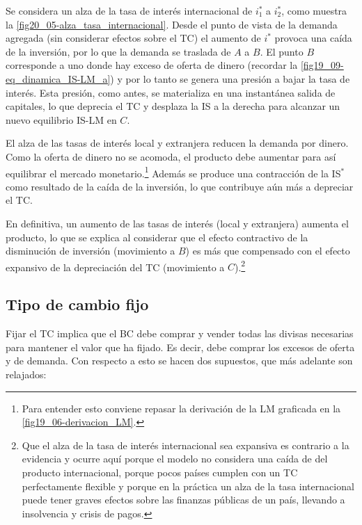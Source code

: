 \documentclass[DeGregorioResumen]{subfiles}
\begin{document}



Se considera un alza de la tasa de interés internacional de $i^*_1$ a $i^*_2$, como muestra la \autoref{fig20_05-alza_tasa_internacional}. Desde el punto de vista de la demanda agregada (sin considerar efectos sobre el TC) el aumento de $i^*$ provoca una caída de la inversión, por lo que la demanda se traslada de $A$ a $B$. El punto $B$ corresponde a uno donde hay exceso de oferta de dinero (recordar la \autoref{fig19_09-eq_dinamica_IS-LM_a}) y por lo tanto se genera una presión a bajar la tasa de interés. Esta presión, como antes, se materializa en una instantánea salida de capitales, lo que deprecia el TC y desplaza la IS a la derecha para alcanzar un nuevo equilibrio IS-LM en $C$.

El alza de las tasas de interés local y extranjera reducen la demanda por dinero. Como la oferta de dinero no se acomoda, el producto debe aumentar para así equilibrar el mercado monetario.\footnote{Para entender esto conviene repasar la derivación de la LM graficada en la \autoref{fig19_06-derivacion_LM}.} Además se produce una contracción de la IS$^*$ como resultado de la caída de la inversión, lo que contribuye aún más a depreciar el TC.

En definitiva, un aumento de las tasas de interés (local y extranjera) aumenta el producto, lo que se explica al considerar que el efecto contractivo de la disminución de inversión (movimiento a $B$) es más que compensado con el efecto expansivo de la depreciación del TC (movimiento a $C$).\footnote{Que el alza de la tasa de interés internacional sea expansiva es contrario a la evidencia y ocurre aquí porque el modelo no considera una caída de del producto internacional, porque pocos países cumplen con un TC perfectamente flexible y porque en la práctica un alza de la tasa internacional puede tener graves efectos sobre las finanzas públicas de un país, llevando a insolvencia y crisis de pagos.}

\subsection{Tipo de cambio fijo}

Fijar el TC implica que el BC debe comprar y vender todas las divisas necesarias para mantener el valor que ha fijado. Es decir, debe comprar los excesos de oferta y de demanda. Con respecto a esto se hacen dos supuestos, que más adelante son relajados:
\end{document}
